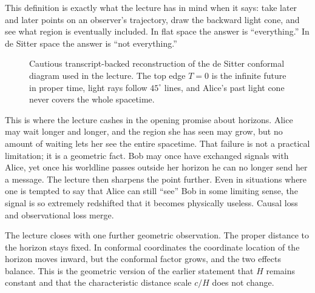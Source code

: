 This definition is exactly what the lecture has in mind when it says: take later and later points on an observer's trajectory, draw the backward light cone, and see what region is eventually included. In flat space the answer is ``everything.'' In de Sitter space the answer is ``not everything.''

\begin{figure}[htbp]
\centering
{}
\caption{Cautious transcript-backed reconstruction of the de Sitter conformal diagram used in the lecture. The top edge \(T=0\) is the infinite future in proper time, light rays follow \(45^\circ\) lines, and Alice's past light cone never covers the whole spacetime.}
\end{figure}

This is where the lecture cashes in the opening promise about horizons. Alice may wait longer and longer, and the region she has seen may grow, but no amount of waiting lets her see the entire spacetime. That failure is not a practical limitation; it is a geometric fact. Bob may once have exchanged signals with Alice, yet once his worldline passes outside her horizon he can no longer send her a message. The lecture then sharpens the point further. Even in situations where one is tempted to say that Alice can still ``see'' Bob in some limiting sense, the signal is so extremely redshifted that it becomes physically useless. Causal loss and observational loss merge.

The lecture closes with one further geometric observation. The proper distance to the horizon stays fixed. In conformal coordinates the coordinate location of the horizon moves inward, but the conformal factor grows, and the two effects balance. This is the geometric version of the earlier statement that \(H\) remains constant and that the characteristic distance scale \(c/H\) does not change.

